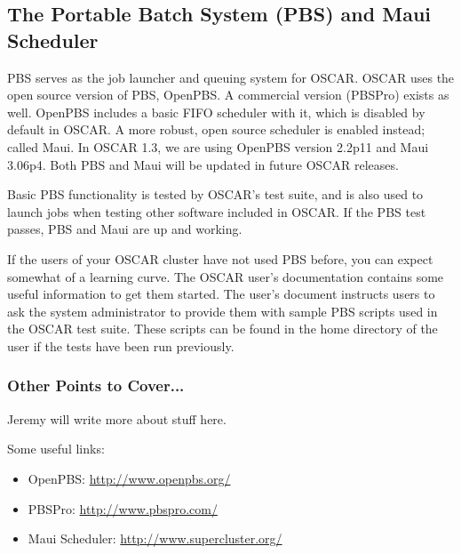 %
%
%

\subsection{The Portable Batch System (PBS) and Maui Scheduler}
\label{app:pbs-overview}

PBS serves as the job launcher and queuing system for OSCAR.  OSCAR
uses the open source version of PBS, OpenPBS.  A commercial version
(PBSPro) exists as well.  OpenPBS includes a basic FIFO scheduler with
it, which is disabled by default in OSCAR.  A more robust, open source
scheduler is enabled instead; called Maui.  In OSCAR 1.3, we are using
OpenPBS version 2.2p11 and Maui 3.06p4.  Both PBS and Maui will be
updated in future OSCAR releases.

Basic PBS functionality is tested by OSCAR's test suite, and is also
used to launch jobs when testing other software included in OSCAR.  If
the PBS test passes, PBS and Maui are up and working.  

If the users of your OSCAR cluster have not used PBS before, you can
expect somewhat of a learning curve.  The OSCAR user's documentation
contains some useful information to get them started.  The user's
document instructs users to ask the system administrator to provide
them with sample PBS scripts used in the OSCAR test suite.  These
scripts can be found in the home directory of the  user
if the tests have been run previously.

\subsubsection{Other Points to Cover...}

\begin{discuss}
  Jeremy will write more about stuff here.
\end{discuss}

Some useful links:

\begin{itemize}
\item OpenPBS: \url{http://www.openpbs.org/}

\item PBSPro: \url{http://www.pbspro.com/}

\item Maui Scheduler: \url{http://www.supercluster.org/}
\end{itemize}

